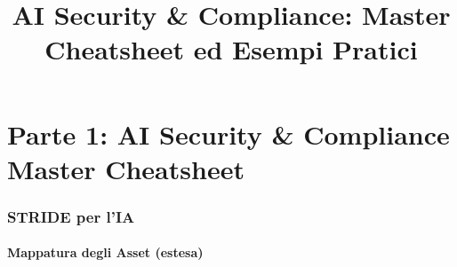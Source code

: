 \documentclass[11pt, a4paper]{article}
\begin{document}
\title{\textbf{AI Security \& Compliance: Master Cheatsheet ed Esempi Pratici}}
\date{}
\maketitle
\tableofcontents
\newpage

\part*{Parte 1: AI Security \& Compliance Master Cheatsheet}

\section{STRIDE per l'IA}

\subsection{Mappatura degli Asset (estesa)}
\end{document}
